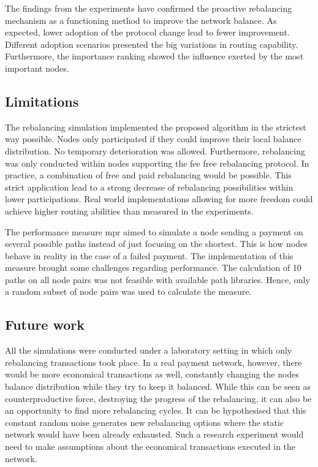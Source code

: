 \documentclass[final]{fhnwreport}       %
\begin{document}
The findings from the experiments have confirmed the proactive rebalancing mechanism as a functioning method to improve the network balance. As expected, lower adoption of the protocol change lead to fewer improvement. Different adoption scenarios presented the big variations in routing capability. Furthermore, the importance ranking showed the influence exerted by the most important nodes.

\subsection{Limitations}
The rebalancing simulation implemented the proposed algorithm in the strictest way possible. Nodes only participated if they could improve their local balance distribution. No temporary deterioration was allowed. Furthermore, rebalancing was only conducted within nodes supporting the fee free rebalancing protocol. In practice, a combination of free and paid rebalancing would be possible. This strict application lead to a strong decrease of rebalancing possibilities within lower participations. Real world implementations allowing for more freedom could achieve higher routing abilities than measured in the experiments.

The performance measure \gls{mpr} aimed to simulate a node sending a payment on several possible paths instead of just focusing on the shortest. This is how nodes behave in reality in the case of a failed payment. The implementation of this measure brought some challenges regarding performance. The calculation of 10 paths on all node pairs was not feasible with available path libraries. Hence, only a random subset of node pairs was used to calculate the measure.

\subsection{Future work}
All the simulations were conducted under a laboratory setting in which only rebalancing transactions took place. In a real payment network, however, there would be more economical transactions as well, constantly changing the nodes balance distribution while they try to keep it balanced. While this can be seen as counterproductive force, destroying the progress of the rebalancing, it can also be an opportunity to find more rebalancing cycles. It can be hypothesised that this constant random noise generates new rebalancing options where the static network would have been already exhausted. Such a research experiment would need to make assumptions about the economical transactions executed in the network.
\end{document}
